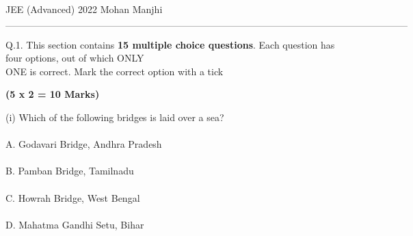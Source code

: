 \documentclass[10pt]{article}
\begin{document}
\newpage
\begin{flushright}JEE (Advanced) 2022 \;\;\;\;\;\;\;\;\;\;\;\;\;\;\;\;\;\;\;\;\;\;\;\;\;\;\;\;\;\;\;\;\;\;\;\;\;\;\;\;\;\;\;\;\;\;\;\;\;\;\;\;\;\;\;\;\;\;\;\;\;\;\;\;\;\;\;\;\;\;\;\;\;\;\;\;\;\;\;\;\;\;\;\;\;\;\;\;\;\;\;\;\;\;\;\;\;\;\;\;\;\;\;\;\;\;\;\;\;\;\;Mohan Manjhi\end{flushright}
$$\textbf{------------------------------------------------------------------------------------------------------------------------------}$$
\begin{center}
\end{center}
Q.1. This section contains \textbf{15 multiple choice questions}. Each question has four options, out of which
ONLY \\
\hspace*{5ex}ONE is correct. Mark the correct option with a tick
 \\ \begin{flushright}
    \textbf{(5 x 2 = 10 Marks)} 
\end{flushright}
(i) Which of the following bridges is laid over a sea? \\ \\
\hspace*{4ex}A. Godavari Bridge, Andhra Pradesh \\ \\
\hspace*{4ex}B. Pamban Bridge, Tamilnadu \\ \\
\hspace*{4ex}C. Howrah Bridge, West Bengal \\ \\
\hspace*{4ex}D. Mahatma Gandhi Setu, Bihar \\ 
\end{document}
